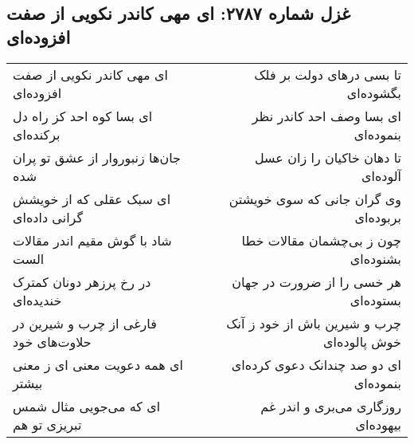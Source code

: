 \begin{center}
\section*{غزل شماره ۲۷۸۷: ای مهی کاندر نکویی از صفت افزوده‌ای}
\label{sec:2787}
\begin{longtable}{l p{0.5cm} r}
ای مهی کاندر نکویی از صفت افزوده‌ای
&&
تا بسی درهای دولت بر فلک بگشوده‌ای
\\
ای بسا کوه احد کز راه دل برکنده‌ای
&&
ای بسا وصف احد کاندر نظر بنموده‌ای
\\
جان‌ها زنبوروار از عشق تو پران شده
&&
تا دهان خاکیان را زان عسل آلوده‌ای
\\
ای سبک عقلی که از خویشش گرانی داده‌ای
&&
وی گران جانی که سوی خویشتن بربوده‌ای
\\
شاد با گوش مقیم اندر مقالات الست
&&
چون ز بی‌چشمان مقالات خطا بشنوده‌ای
\\
در رخ پرزهر دونان کمترک خندیده‌ای
&&
هر خسی را از ضرورت در جهان بستوده‌ای
\\
فارغی از چرب و شیرین در حلاوت‌های خود
&&
چرب و شیرین باش از خود ز آنک خوش پالوده‌ای
\\
ای همه دعویت معنی ای ز معنی بیشتر
&&
ای دو صد چندانک دعوی کرده‌ای بنموده‌ای
\\
ای که می‌جویی مثال شمس تبریزی تو هم
&&
روزگاری می‌بری و اندر غم بیهوده‌ای
\\
\end{longtable}
\end{center}
